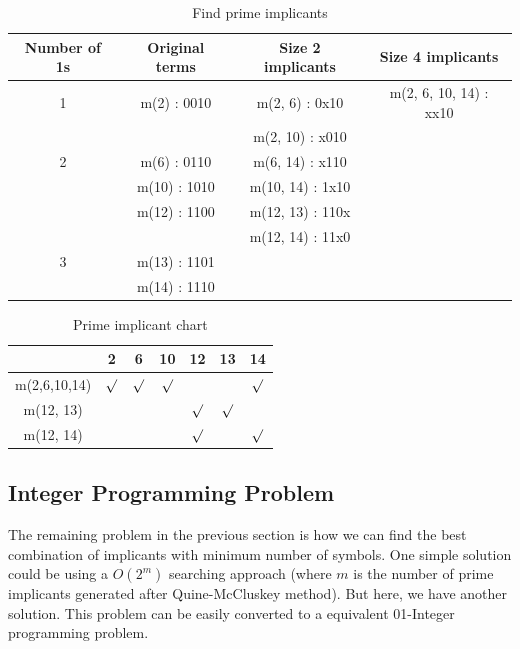 \documentclass[11pt]{book}
\begin{document}
\begin{table}
	\centering
	
	\begin{tabular}{c|c|c|c}
		\hline
		Number of 1s & Original terms & Size 2 implicants & Size 4 implicants \\
		\hline
		1 &  m(2) : 0010 &   m(2, 6) : 0x10 & m(2, 6, 10, 14) : xx10 \\
		  &              &  m(2, 10) : x010 \\ 
		\hline
		2 &  m(6) : 0110 &  m(6, 14) : x110 \\
		  & m(10) : 1010 & m(10, 14) : 1x10 \\
		  & m(12) : 1100 & m(12, 13) : 110x \\
		  &              & m(12, 14) : 11x0 \\
		\hline
		3 & m(13) : 1101 \\
		  & m(14) : 1110 \\
		\hline
	\end{tabular}
	
	\caption{Find prime implicants}
\end{table}

\begin{table}
	\centering
	
	\begin{tabular}{c|c|c|c|c|c|c}
		\hline
		& 2 & 6 & 10 & 12 & 13 & 14 \\
		\hline
		m(2,6,10,14) & $\surd$ & $\surd$ & $\surd$ &         &         & $\surd$ \\
		m(12, 13)    &         &         &         & $\surd$ & $\surd$ &         \\
		m(12, 14)    &         &         &         & $\surd$ &         & $\surd$ \\
		\hline
	\end{tabular}
	
	\caption{Prime implicant chart}
\end{table}

\subsection{Integer Programming Problem}

The remaining problem in the previous section is how we can find the best combination of implicants with minimum number of symbols. One simple solution could be using a $O(2^m)$ searching approach (where $m$ is the number of prime implicants generated after Quine-McCluskey method). But here, we have another solution. This problem can be easily converted to a equivalent 01-Integer programming problem.
\end{document}
